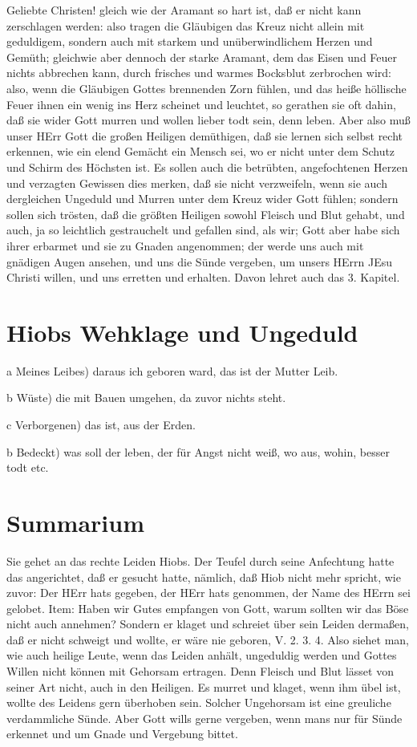 Geliebte Christen! gleich wie der Aramant so hart ist, daß er nicht kann zerschlagen werden: also tragen die Gläubigen das Kreuz nicht allein mit geduldigem, sondern auch mit starkem und unüberwindlichem Herzen und Gemüth; gleichwie aber dennoch der starke Aramant, dem das Eisen und Feuer nichts abbrechen kann, durch frisches und warmes Bocksblut zerbrochen wird: also, wenn die Gläubigen Gottes brennenden Zorn fühlen, und das heiße höllische Feuer ihnen ein wenig ins Herz scheinet und leuchtet, so gerathen sie oft dahin, daß sie wider Gott murren und wollen lieber todt sein, denn leben. Aber also muß unser HErr Gott die großen Heiligen demüthigen, daß sie lernen sich selbst recht erkennen, wie ein elend Gemächt ein Mensch sei, wo er nicht unter dem Schutz und Schirm des Höchsten ist. Es sollen auch die betrübten, angefochtenen Herzen und verzagten Gewissen dies merken, daß sie nicht verzweifeln, wenn sie auch dergleichen Ungeduld und Murren unter dem Kreuz wider Gott fühlen; sondern sollen sich trösten, daß die größten Heiligen sowohl Fleisch und Blut gehabt, und auch, ja so leichtlich gestrauchelt und gefallen sind, als wir; Gott aber habe sich ihrer erbarmet und sie zu Gnaden angenommen; der werde uns auch mit gnädigen Augen ansehen, und uns die Sünde vergeben, um unsers HErrn JEsu Christi willen, und uns erretten und erhalten. Davon lehret auch das 3. Kapitel.

\section{Hiobs Wehklage und Ungeduld}

a Meines Leibes) daraus ich geboren ward, das ist der Mutter Leib.

b Wüste) die mit Bauen umgehen, da zuvor nichts steht.

c Verborgenen) das ist, aus der Erden.

b Bedeckt) was soll der leben, der für Angst nicht weiß, wo aus, wohin, besser todt etc.

\section{Summarium}

Sie gehet an das rechte Leiden Hiobs. Der Teufel durch seine Anfechtung hatte das angerichtet, daß er gesucht hatte, nämlich, daß Hiob nicht mehr spricht, wie zuvor: Der HErr hats gegeben, der HErr hats genommen, der Name des HErrn sei gelobet. Item: Haben wir Gutes empfangen von Gott, warum sollten wir das Böse nicht auch annehmen? Sondern er klaget und schreiet über sein Leiden dermaßen, daß er nicht schweigt und wollte, er wäre nie geboren, V. 2. 3. 4. Also siehet man, wie auch heilige Leute, wenn das Leiden anhält, ungeduldig werden und Gottes Willen nicht können mit Gehorsam ertragen. Denn Fleisch und Blut lässet von seiner Art nicht, auch in den Heiligen. Es murret und klaget, wenn ihm übel ist, wollte des Leidens gern überhoben sein. Solcher Ungehorsam ist eine greuliche verdammliche Sünde. Aber Gott wills gerne vergeben, wenn mans nur für Sünde erkennet und um Gnade und Vergebung bittet.


